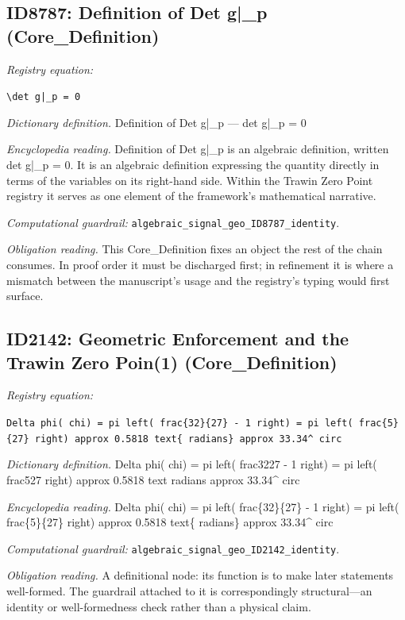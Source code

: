 \documentclass[11pt]{article}
\theoremstyle{remark}
\begin{document}
\subsection{ID8787: Definition of Det g|\_p (Core\_Definition)}

\noindent\textit{Registry equation:}\par
{\small\texttt{\textbackslash{}det g|\_p = 0}}\par\medskip
\noindent\textit{Dictionary definition.} Definition of Det g|\_p --- det g|\_p = 0\par\medskip
\noindent\textit{Encyclopedia reading.} Definition of Det g|\_p is an algebraic definition, written det g|\_p = 0. It is an algebraic definition expressing the quantity directly in terms of the variables on its right-hand side. Within the Trawin Zero Point registry it serves as one element of the framework's mathematical narrative.
\par\medskip\noindent\textit{Computational guardrail:} \texttt{algebraic\_signal\_geo\_ID8787\_identity}.
\par\medskip\noindent\textit{Obligation reading.} This Core\_Definition fixes an object the rest of the chain consumes. In proof order it must be discharged first; in refinement it is where a mismatch between the manuscript's usage and the registry's typing would first surface.

\subsection{ID2142: Geometric Enforcement and the Trawin Zero Poin(1) (Core\_Definition)}

\noindent\textit{Registry equation:}\par
{\small\texttt{Delta phi( chi) = pi left( frac\{32\}\{27\} - 1 right) = pi left( frac\{5\}\{27\} right) approx 0.5818 text\{ radians\} approx 33.34\textasciicircum{} circ}}\par\medskip
\noindent\textit{Dictionary definition.} Delta phi( chi) = pi left( frac3227 - 1 right) = pi left( frac527 right) approx 0.5818 text radians approx 33.34\textasciicircum{} circ\par\medskip
\noindent\textit{Encyclopedia reading.} Delta phi( chi) = pi left( frac\{32\}\{27\} - 1 right) = pi left( frac\{5\}\{27\} right) approx 0.5818 text\{ radians\} approx 33.34\textasciicircum{} circ
\par\medskip\noindent\textit{Computational guardrail:} \texttt{algebraic\_signal\_geo\_ID2142\_identity}.
\par\medskip\noindent\textit{Obligation reading.} A definitional node: its function is to make later statements well-formed. The guardrail attached to it is correspondingly structural---an identity or well-formedness check rather than a physical claim.
\end{document}
